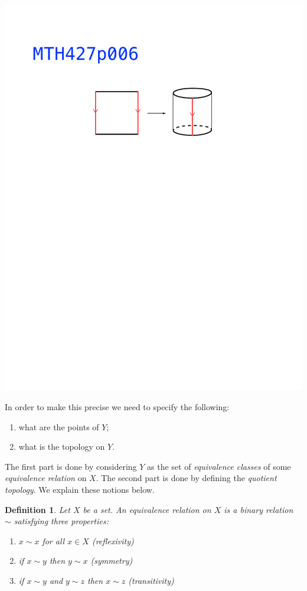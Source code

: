 \documentclass[11pt, letterpaper, oneside]{report}
\theoremstyle{pplain}
\newtheorem{ITERMVALUE THM}[theorem]{Intermediate Value Theorem}
\newtheorem{HEINEBOREL THM}[theorem]{Heine-Borel Theorem}
\newtheorem{UMETR THM}[theorem]{Urysohn Metrization Theorem}
\newtheorem{UMETR2 THM}[theorem]{Urysohn Metrization Theorem (v.2)}
\theoremstyle{ddefinition}
\newtheorem{definition}[theorem]{Definition}
\theoremstyle{nnn}
\newtheorem{TDA NN}[theorem]{Topological Data Analysis. }
\theoremstyle{eexercise}
\newcommand{\benu}{\begin{enumerate}}
\newcommand{\eenu}{\end{enumerate}}
\begin{document}
{{\includegraphics[width=\textwidth, trim=0mm 183mm 0mm 57mm, clip]{pictures/MTH427p006.pdf}}}

In order to make this precise we need to specify the following:
\benu
\item what are the points of $Y$; 
\item what is the topology on $Y$. 
\eenu

The first part is done by considering $Y$ as  the set of \emph{equivalence classes} of some 
\emph{equivalence relation} on $X$. The second part is done by defining the 
\emph{quotient topology}. We explain these notions below. 

\begin{definition}
Let $X$ be a set. An \emph{equivalence relation on $X$} is a binary relation $\sim$ satisfying three 
properties:
\benu
\item $x\sim x$ for all $x\in X$ (reflexivity)
\item if $x\sim y$ then $y\sim x$ (symmetry)
\item  if $x\sim y$ and $y\sim z$ then $x\sim z$ (transitivity)
\eenu
\end{definition}
\end{document}
